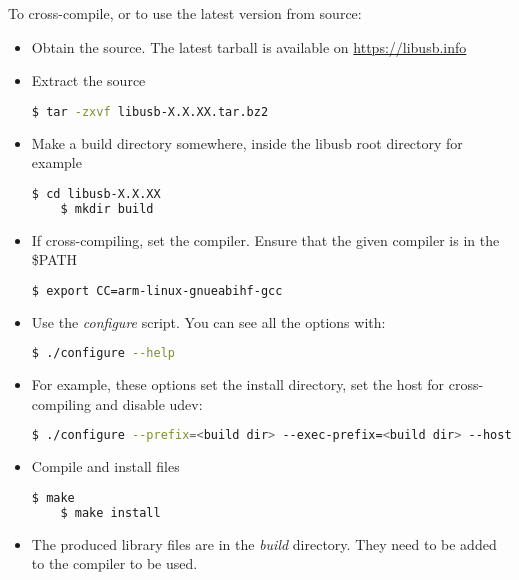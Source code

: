 \documentclass{article}
\begin{document}
    To cross-compile, or to use the latest version from source:
    \begin{itemize}
    	\itemsep0em
    	\item Obtain the source. The latest tarball is available on \url{https://libusb.info}
    	\item Extract the source
    	
    \begin{lstlisting}[language=bash]
    $ tar -zxvf libusb-X.X.XX.tar.bz2
    \end{lstlisting}
    
    	\item Make a build directory somewhere, inside the libusb root directory for example
    	
    \begin{lstlisting}[language=bash]
    $ cd libusb-X.X.XX
    $ mkdir build
    \end{lstlisting}
    
    	\item If cross-compiling, set the compiler. Ensure that the given compiler is in the \$PATH
    	
    \begin{lstlisting}[language=bash]
    $ export CC=arm-linux-gnueabihf-gcc
    \end{lstlisting}
    
    	\item Use the \textit{configure} script. You can see all the options with:
    	
    \begin{lstlisting}[language=bash]
    $ ./configure --help
    \end{lstlisting}
    
    	\item For example, these options set the install directory, set the host for cross-compiling and disable udev:
    
    \begin{lstlisting}[language=bash]
    $ ./configure --prefix=<build dir> --exec-prefix=<build dir> --host=arm-linux-gnueabihf --disable-udev
    \end{lstlisting}
    
    \item Compile and install files
    
    \begin{lstlisting}[language=bash]
    $ make
    $ make install
    \end{lstlisting}
    
    \item The produced library files are in the \textit{build} directory. They need to be added to the compiler to be used. 
    
    \end{itemize}
    
\end{document}
